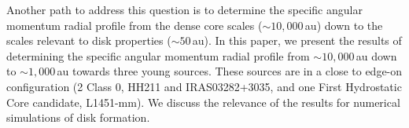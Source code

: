 Another path to address this question is to determine the specific angular momentum radial profile from the dense core scales ($\sim 10,000$\,au) 
down to the scales relevant to disk properties ($\sim 50 $\,au). 
%
In this paper, we present the results of determining the specific angular momentum radial profile from 
$\sim 10,000$\,au down to $\sim 1,000$\,au towards three young sources.
These sources are in a close to edge-on configuration (2 Class 0, HH211 and IRAS03282+3035, 
and one First Hydrostatic Core candidate, L1451-mm).
We discuss the relevance of the results for numerical simulations of disk formation. 